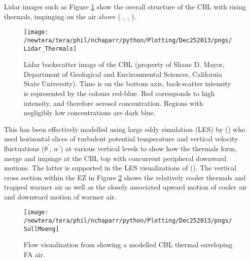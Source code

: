 Lidar images such as Figure \ref{fig:DuPeFla} show the overall structure of the \acs{CBL} with rising thermals, impinging on the air above (\citeauthor{CrumStullEl} \citeyear{CrumStullEl}, \citeauthor{CruStu} \citeyear{CruStu}, \citeauthor{Traum11} \citeyear{Traum11}).  

\begin{figure}[htbp]
    \centering
    \texttt{[image: /newtera/tera/phil/nchaparr/python/Plotting/Dec252013/pngs/Lidar\_Thermals]}
    \caption[Lidar backscatter image of the \acs{CBL}]{Lidar backscatter image of the \acs{CBL} (property of Shane D. Mayor, Department of Geological and Environmental Sciences, California State University).  Time is on the bottom axis, back-scatter intensity is represented by the colours red-blue.  Red corresponds to high intensity, and therefore aerosol concentration.  Regions with negligibly low concentrations are dark blue.}
    \label{fig:DuPeFla}   %
\end{figure}

This has been effectively modelled using large eddy simulation (\acs{LES}) by \citeauthor{SchmidtSchu} (\citeyear{SchmidtSchu}) who used horizontal slices of turbulent potential temperature and vertical velocity fluctuations ($\theta^{'}$, $w^{'}$) at various vertical levels to show how the thermals form, merge and impinge at the \acs{CBL} top with concurrent peripheral downward motions.  The latter is supported in the \acs{LES} visualizations of \citeauthor{SullMoengStev} (\citeyear{SullMoengStev}).  The vertical cross section within the \acs{EZ} in Figure \ref{fig:SullMoeng} shows the relatively cooler thermals and trapped warmer air as well as the closely associated upward motion of cooler air and downward motion of warmer air.\\ 

\begin{figure}[htbp]
    \centering
    \texttt{[image: /newtera/tera/phil/nchaparr/python/Plotting/Dec252013/pngs/SullMoeng]}
    \caption[Visualization of entrainment from an \acs{LES}]{Flow visualization from \citeauthor{SullMoengStev} \citeyear{SullMoengStev} showing a modelled \acs{CBL} thermal enveloping \acs{FA} air.}
    \label{fig:SullMoeng}   %
\end{figure}

